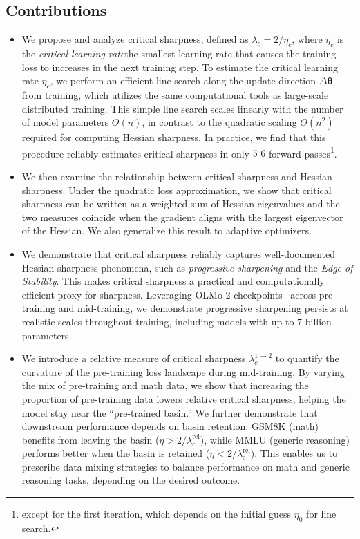 \documentclass[]{fairmeta}
\theoremstyle{plain}
\theoremstyle{definition}
\begin{document}
\subsection{Contributions}

\begin{itemize}
    \item We propose and analyze critical sharpness, defined as $\lambda_c = 2 / \eta_c$, where $\eta_c$ is the \emph{critical learning rate}\textemdash the smallest learning rate that causes the training loss to increases in the next training step. To estimate the critical learning rate $\eta_c$, we perform an efficient line search along the update direction $\Delta \bm{\theta}$ from training, which utilizes the same computational tools as  large-scale distributed training.
    This simple line search scales linearly with the number of model parameters $\Theta(n)$, in contrast to the quadratic scaling $\Theta(n^2)$ required for computing Hessian sharpness. In practice, we find that this procedure reliably estimates critical sharpness in only $5$-$6$ forward passes\footnote{except for the first iteration, which depends on the initial guess $\eta_0$ for line search.}.
    \item {}
    We then examine the relationship between critical sharpness and Hessian sharpness. Under the quadratic loss approximation, we show that critical sharpness can be written as a weighted sum of Hessian eigenvalues and the two measures coincide when the gradient aligns with the largest eigenvector of the Hessian. We also generalize this result to adaptive optimizers.
    
    \item We demonstrate that critical sharpness reliably captures well-documented Hessian sharpness phenomena, such as \emph{progressive sharpening} and the \emph{Edge of Stability}. This makes critical sharpness a practical and computationally efficient proxy for sharpness. Leveraging OLMo-2 checkpoints~\citep{walsh2025} across pre-training and mid-training, we demonstrate progressive sharpening persists at realistic scales throughout training, including models with up to 7 billion parameters.

    \item We introduce a relative measure of critical sharpness $\lambda_c^{1 \to 2}$ to quantify the curvature of the pre-training loss landscape during mid-training. By varying the mix of pre-training and math data, we show that increasing the proportion of pre-training data lowers relative critical sharpness, helping the model stay near the ``pre-trained basin.'' We further demonstrate that downstream performance depends on basin retention: GSM8K (math) benefits from leaving the basin ($\eta > 2 / \lambda_c^{\text{rel}}$), while MMLU (generic reasoning) performs better when the basin is retained ($\eta < 2 / \lambda_c^{\text{rel}}$). This enables us to prescribe data mixing strategies to balance performance on math and generic reasoning tasks, depending on the desired outcome.


\end{itemize}
\end{document}
